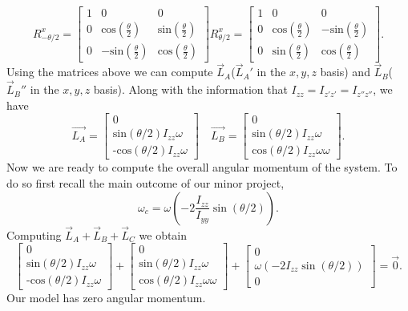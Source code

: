 \documentclass[12]{amsart}
\theoremstyle{definition}
\begin{document}
\begin{equation*}
R_{-\theta/2}^x =
\begin{bmatrix}
1 & 0 & 0 \\
0 & \text{cos}(\frac{\theta}{2}) & \text{sin}(\frac{\theta}{2}) \\
0 & -\text{sin}(\frac{\theta}{2}) & \text{cos}(\frac{\theta}{2})
\end{bmatrix}
    R_{\theta/2}^x =
\begin{bmatrix}
1 & 0 & 0 \\
0 & \text{cos}(\frac{\theta}{2}) & -\text{sin}(\frac{\theta}{2}) \\
0 & \text{sin}(\frac{\theta}{2}) & \text{cos}(\frac{\theta}{2})
\end{bmatrix}.
\end{equation*}
Using the matrices above we can compute $\vec{L}_A$($\vec{L}_A'$ in the $x,y,z$ basis) and $\vec{L}_B$($\vec{L}_B''$ in the $x,y,z$ basis). Along with the information that $I_{zz} = I_{z'z'} = I_{z''z''}$, we have
\begin{equation*}
    \vec{L_A} = 
    \begin{bmatrix}
    0\\
    \text{sin}(\theta /2)I_{z z}\omega\\
    \text{-cos}(\theta /2)I_{z z}\omega
    \end{bmatrix}
    \quad
    \vec{L_B} = 
    \begin{bmatrix}
    0\\
    \text{sin}(\theta /2)I_{z z}\omega\\
    \text{cos}(\theta /2)I_{z z}\omega\omega
    \end{bmatrix}.
\end{equation*}
Now we are ready to compute the overall angular momentum of the system. To do so first recall the main outcome of our minor project, $$\omega_c =\omega\left(-2\frac{I_{zz}}{I_{yy}}\sin{\left(\theta/2\right)}\right).$$ Computing $\vec{L}_A + \vec{L}_B +\vec{L}_C$ we obtain
\begin{equation*}
    \begin{bmatrix}
    0\\
    \text{sin}(\theta /2)I_{z z}\omega\\
    \text{-cos}(\theta /2)I_{z z}\omega
    \end{bmatrix}
    +
    \begin{bmatrix}
    0\\
    \text{sin}(\theta /2)I_{z z}\omega\\
    \text{cos}(\theta /2)I_{z z}\omega\omega
    \end{bmatrix}
    +
     \begin{bmatrix}
    0\\
    \omega\left(-2I_{zz}\sin{\left(\theta/2\right)}\right)\\
    0
    \end{bmatrix}
    =\vec{0}.
\end{equation*}
Our model has zero angular momentum.
\end{document}
